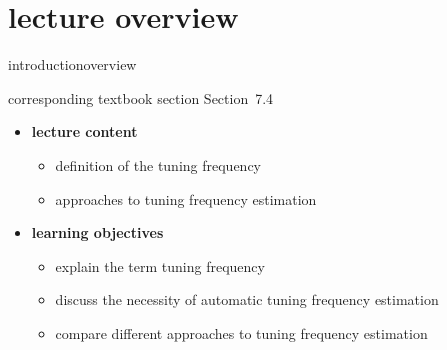 


\subtitle{Module 7.4: Tuning Frequency Estimation}


	

    \section[overview]{lecture overview}
        \begin{frame}{introduction}{overview}
            \begin{block}{corresponding textbook section}
                    Section~7.4
            \end{block}

            \begin{itemize}
                \item   \textbf{lecture content}
                    \begin{itemize}
                        \item   definition of the tuning frequency
                        \item   approaches to tuning frequency estimation
                    \end{itemize}
                \bigskip
                \item<2->   \textbf{learning objectives}
                    \begin{itemize}
                        \item   explain the term tuning frequency
                        \item   discuss the necessity of automatic tuning frequency estimation
                        \item   compare different approaches to tuning frequency estimation
                    \end{itemize}
            \end{itemize}
        \end{frame}
        

